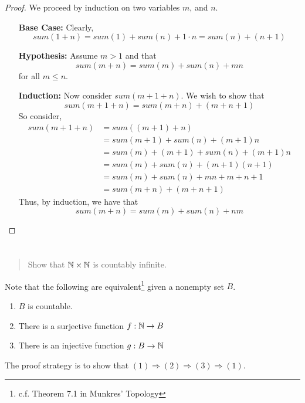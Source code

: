 \documentclass{article}
\begin{document}
\begin{proof}
    We proceed by induction on two variables $m$, and $n$.
    \begin{itemize}
        \item[\textbf{Base Case:}] Clearly,
              \[sum(1 + n) = sum(1) + sum(n) + 1 \cdot n = sum(n) + (n + 1)\]
        \item[\textbf{Hypothesis:}] Assume $m > 1$ and that
              \[sum(m + n) = sum(m) + sum(n) + mn\]
              for all $m \leq n$.
        \item[\textbf{Induction:}] Now consider $sum(m + 1 + n)$. We wish to show that
              \[sum(m + 1 + n) = sum(m + n) + (m + n + 1)\]
              So consider,
              \begin{align*}
                  sum(m + 1 + n) & = sum((m + 1) + n)                     \\
                                 & = sum(m + 1) + sum(n) + (m + 1)n       \\
                                 & = sum(m) + (m + 1) + sum(n) + (m + 1)n \\
                                 & = sum(m) + sum(n) + (m + 1)(n + 1)     \\
                                 & = sum(m) + sum(n) + mn + m + n + 1     \\
                                 & = sum(m + n) + (m + n + 1)
              \end{align*}
              Thus, by induction, we have that
              \[sum(m + n) = sum(m) + sum(n) + nm\]
    \end{itemize}
\end{proof}

\section{}
\begin{quote}
    Show that $\mathbb{N} \times \mathbb{N}$ is countably infinite.
\end{quote}

Note that the following are equivalent\footnote{c.f. Theorem 7.1 in Munkres' Topology} given a
nonempty set $B$.
\begin{enumerate}
    \item $B$ is countable.
    \item There is a surjective function $f : \mathbb{N} \to B$
    \item There is an injective function $g : B \to \mathbb{N}$
\end{enumerate}
The proof strategy is to show that $(1) \Rightarrow (2) \Rightarrow (3) \Rightarrow (1)$.
\end{document}
